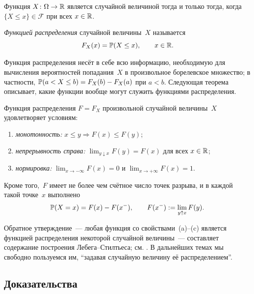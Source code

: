 \begin{lemma}
\label{lem:rv-equiv-criterion}
Функция $X \colon \Omega \to \mathbb{R}$ является случайной величиной тогда и только тогда, когда $\{X \leq x\} \in \mathcal{F}$ при всех $x \in \mathbb{R}$.
\end{lemma}

\begin{definition}
\label{def:cdf}
\emph{Функцией распределения} случайной величины~$X$ называется
\[
  F_X(x) = \mathbb{P}(X \leq x), \qquad x \in \mathbb{R}.
\]
\end{definition}

Функция распределения несёт в себе всю информацию, необходимую для вычисления вероятностей попадания~$X$ в произвольное борелевское множество; в частности, $\mathbb{P}(a < X \leq b) = F_X(b) - F_X(a)$ при $a < b$. Следующая теорема описывает, какие функции вообще могут служить функциями распределения.

\begin{theorem}
\label{thm:cdf-properties}
Функция распределения $F = F_X$ произвольной случайной величины~$X$ удовлетворяет условиям:
\begin{enumerate}[label=(\alph*)]
  \item \emph{монотонность:} $x \leq y \Rightarrow F(x) \leq F(y)$;
  \item \emph{непрерывность справа:} $\lim_{y \downarrow x} F(y) = F(x)$ для всех $x \in \mathbb{R}$;
  \item \emph{нормировка:} $\lim_{x \to -\infty} F(x) = 0$ и $\lim_{x \to +\infty} F(x) = 1$.
\end{enumerate}
Кроме того,~$F$ имеет не более чем счётное число точек разрыва, и в каждой такой точке~$x$ выполнено
\[
  \mathbb{P}(X = x) = F(x) - F(x^{-}), \qquad F(x^{-}) := \lim_{y \uparrow x} F(y).
\]
\end{theorem}

\begin{remark}
Обратное утверждение~--- любая функция со свойствами~(a)--(c) является функцией распределения некоторой случайной величины~--- составляет содержание построения Лебега--Стилтьеса; см. \cite[гл.~II, \S~3]{Shiryaev1989}. В дальнейших темах мы свободно пользуемся им, ``задавая случайную величину её распределением''.
\end{remark}

\subsection*{Доказательства}

